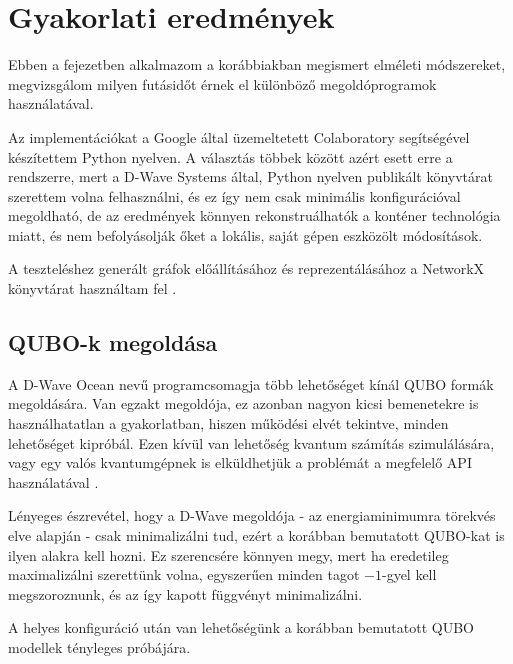 
\chapter{Gyakorlati eredmények}
Ebben a fejezetben alkalmazom a korábbiakban megismert elméleti módszereket, megvizsgálom milyen futásidőt érnek el különböző megoldóprogramok használatával.

Az implementációkat a Google által üzemeltetett Colaboratory segítségével készítettem Python nyelven. A választás többek között azért esett erre a rendszerre, mert a D-Wave Systems által, Python nyelven publikált könyvtárat szerettem volna felhasználni, és ez így nem csak minimális konfigurációval megoldható, de az eredmények könnyen rekonstruálhatók a konténer technológia miatt, és nem befolyásolják őket a lokális, saját gépen eszközölt módosítások.

A teszteléshez generált gráfok előállításához és reprezentálásához a NetworkX könyvtárat használtam fel \cite{NetworkX}.

\section{QUBO-k megoldása}

A D-Wave Ocean nevű programcsomagja több lehetőséget kínál QUBO formák megoldására. Van egzakt megoldója, ez azonban nagyon kicsi bemenetekre is használhatatlan a gyakorlatban, hiszen működési elvét tekintve, minden lehetőséget kipróbál. Ezen kívül van lehetőség kvantum számítás szimulálására, vagy egy valós kvantumgépnek is elküldhetjük a problémát a megfelelő API használatával \cite{DWaveOcean}.

Lényeges észrevétel, hogy a D-Wave megoldója - az energiaminimumra törekvés elve alapján - csak minimalizálni tud, ezért a korábban bemutatott QUBO-kat is ilyen alakra kell hozni. Ez szerencsére könnyen megy, mert ha eredetileg maximalizálni szerettünk volna, egyszerűen minden tagot $-1$-gyel kell megszoroznunk, és az így kapott függvényt minimalizálni.

A helyes konfiguráció után van lehetőségünk a korábban bemutatott QUBO modellek tényleges próbájára.

